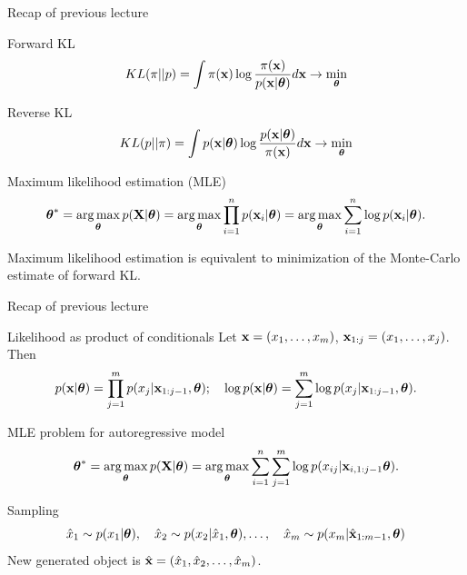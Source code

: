 \begin{frame}{Recap of previous lecture}
	\begin{block}{Forward KL}
		\vspace{-0.2cm}
		\[
		KL(\pi || p) = \int \pi (\mathbf{x}) \log \frac{\pi(\mathbf{x})}{p(\mathbf{x} | \boldsymbol{\theta})} d \mathbf{x} \rightarrow \min_{\boldsymbol{\theta}}
		\]
	\end{block}
	\begin{block}{Reverse KL}
		\vspace{-0.2cm}
		\[
		KL(p || \pi) = \int p (\mathbf{x}| \boldsymbol{\theta}) \log \frac{p(\mathbf{x}| \boldsymbol{\theta})}{\pi(\mathbf{x})} d \mathbf{x} \rightarrow \min_{\boldsymbol{\theta}}
		\]
	\end{block}
	
	\begin{block}{Maximum likelihood estimation (MLE)}
		\vspace{-0.5cm}
		\[
		\boldsymbol{\theta}^* = \operatorname*{arg\,max}_{\boldsymbol{\theta}} p(\mathbf{X} | \boldsymbol{\theta}) = \operatorname*{arg\,max}_{\boldsymbol{\theta}} \prod_{i=1}^n p(\mathbf{x}_i | \boldsymbol{\theta}) = \operatorname*{arg\,max}_{\boldsymbol{\theta}} \sum_{i=1}^n \log p(\mathbf{x}_i | \boldsymbol{\theta}).
		\]
		\vspace{-0.1cm}
	\end{block}
	Maximum likelihood estimation is equivalent to minimization of the Monte-Carlo estimate of forward KL.
\end{frame}
\begin{frame}{Recap of previous lecture}
	\begin{block}{Likelihood as product of conditionals}
		Let $\mathbf{x} = (x_1, \dots, x_m)$, $\mathbf{x}_{1:j} = (x_1, \dots, x_j)$. Then 
		\[
		p(\mathbf{x} | \boldsymbol{\theta}) = \prod_{j=1}^m p(x_j | \mathbf{x}_{1:j - 1}, \boldsymbol{\theta}); \quad 
		\log p(\mathbf{x} | \boldsymbol{\theta}) = \sum_{j=1}^m \log p(x_j | \mathbf{x}_{1:j - 1}, \boldsymbol{\theta}).
		\]
	\end{block}
	\vspace{-0.3cm}
	\begin{block}{MLE problem for autoregressive model}
		\vspace{-0.5cm}
		\[
		\boldsymbol{\theta}^* = \operatorname*{arg\,max}_{\boldsymbol{\theta}} p(\mathbf{X} | \boldsymbol{\theta}) = \operatorname*{arg\,max}_{\boldsymbol{\theta}} \sum_{i=1}^n \sum_{j=1}^m \log p(x_{ij} | \mathbf{x}_{i, 1:j - 1}\boldsymbol{\theta}).
		\]
		\vspace{-0.5cm}
	\end{block}
	\begin{block}{Sampling}
		\vspace{-0.5cm}
		\[
			\hat{x}_1 \sim p(x_1 | \boldsymbol{\theta}), \quad \hat{x}_2 \sim p(x_2 | \hat{x}_1, \boldsymbol{\theta}), \dots, \quad \hat{x}_m \sim p(x_m | \hat{\mathbf{x}}_{1:m-1}, \boldsymbol{\theta})
		\]
		New generated object is $\hat{\mathbf{x}} = (\hat{x}_1, \hat{x}_2, \dots, \hat{x}_m)$.
	\end{block}
\end{frame}
